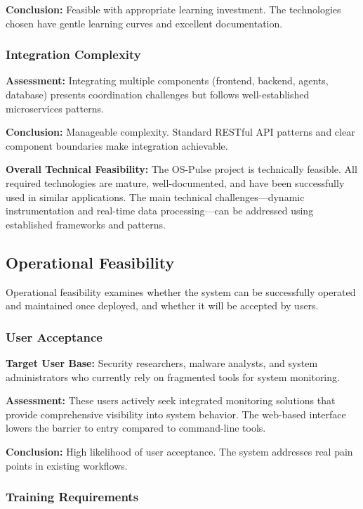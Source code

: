 \textbf{Conclusion:} Feasible with appropriate learning investment. The technologies chosen have gentle learning curves and excellent documentation.

\subsubsection{Integration Complexity}

\textbf{Assessment:} Integrating multiple components (frontend, backend, agents, database) presents coordination challenges but follows well-established microservices patterns.

\textbf{Conclusion:} Manageable complexity. Standard RESTful API patterns and clear component boundaries make integration achievable.

\textbf{Overall Technical Feasibility:} The OS-Pulse project is technically feasible. All required technologies are mature, well-documented, and have been successfully used in similar applications. The main technical challenges—dynamic instrumentation and real-time data processing—can be addressed using established frameworks and patterns.

\subsection{Operational Feasibility}

Operational feasibility examines whether the system can be successfully operated and maintained once deployed, and whether it will be accepted by users.

\subsubsection{User Acceptance}

\textbf{Target User Base:} Security researchers, malware analysts, and system administrators who currently rely on fragmented tools for system monitoring.

\textbf{Assessment:} These users actively seek integrated monitoring solutions that provide comprehensive visibility into system behavior. The web-based interface lowers the barrier to entry compared to command-line tools.

\textbf{Conclusion:} High likelihood of user acceptance. The system addresses real pain points in existing workflows.

\subsubsection{Training Requirements}

